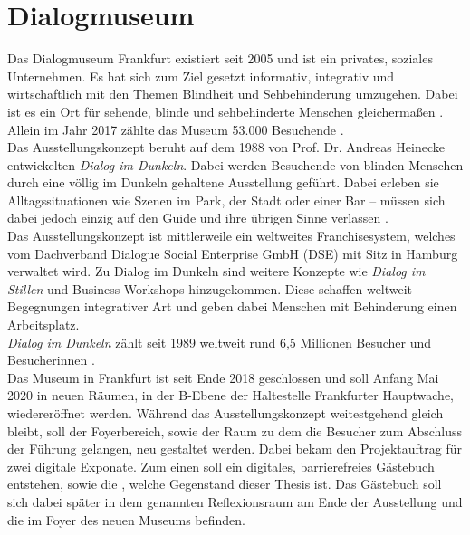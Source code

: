 \section{Dialogmuseum}
\label{sec:dialogmuseum}

Das Dialogmuseum Frankfurt existiert seit 2005 und ist ein privates, soziales 
Unternehmen. Es hat sich zum Ziel gesetzt informativ, integrativ und wirtschaftlich mit 
den Themen Blindheit und Sehbehinderung umzugehen. Dabei ist es ein Ort für sehende, 
blinde und sehbehinderte Menschen gleichermaßen \cite{dialogmuseum}. Allein im Jahr 2017 zählte das Museum 53.000 
Besuchende \cite{besucher}.\\

Das Ausstellungskonzept beruht auf dem 1988 von Prof. Dr. Andreas Heinecke entwickelten
\emph{Dialog im Dunkeln}. Dabei werden Besuchende von blinden Menschen durch eine 
völlig im Dunkeln gehaltene Ausstellung geführt. Dabei erleben sie Alltagssituationen
wie Szenen im Park, der Stadt oder einer Bar -- müssen sich dabei jedoch einzig auf
den Guide und ihre übrigen Sinne verlassen \cite{dialogmuseum}.\\
Das Ausstellungskonzept ist mittlerweile ein weltweites Franchisesystem, welches vom 
Dachverband Dialogue Social Enterprise GmbH (DSE) \cite{dachverband} mit Sitz in Hamburg verwaltet wird.
Zu Dialog im Dunkeln sind weitere Konzepte wie \emph{Dialog im Stillen} und Business Workshops
hinzugekommen. Diese schaffen weltweit Begegnungen integrativer Art und geben dabei 
Menschen mit Behinderung einen Arbeitsplatz.\\
\emph{Dialog im Dunkeln} zählt seit 1989 weltweit rund 6,5 Millionen Besucher und Besucherinnen
\cite{weltweit}.\\

Das Museum in Frankfurt ist seit Ende 2018 geschlossen und soll Anfang Mai 2020 in neuen Räumen, in der B-Ebene
der Haltestelle Frankfurter Hauptwache, wiedereröffnet werden. Während das Ausstellungskonzept
weitestgehend gleich bleibt, soll der Foyerbereich, sowie der Raum zu dem die Besucher zum Abschluss
der Führung gelangen, neu gestaltet werden. Dabei bekam \meso{} den Projektauftrag für zwei
digitale Exponate. Zum einen soll ein digitales, barrierefreies Gästebuch entstehen, sowie die
\shst{}, welche Gegenstand dieser Thesis ist. Das Gästebuch soll sich dabei später in dem 
genannten Reflexionsraum am Ende der Ausstellung und die \shst{} im Foyer des neuen Museums befinden.
